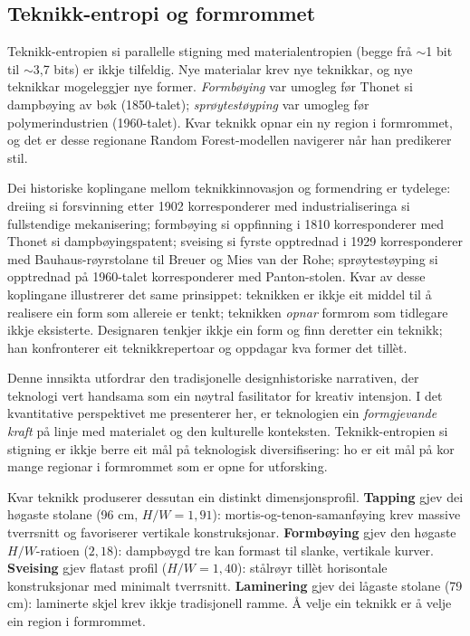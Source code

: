 \documentclass[10pt, a4paper, twocolumn]{article}
\begin{document}
\subsection{Teknikk-entropi og formrommet}

Teknikk-entropien si parallelle stigning med materialentropien (begge frå $\sim$1 bit til $\sim$3,7 bits) er ikkje tilfeldig. Nye materialar krev nye teknikkar, og nye teknikkar mogeleggjer nye former. \emph{Formbøying} var umogleg før Thonet si dampbøying av bøk (1850-talet); \emph{sprøytestøyping} var umogleg før polymerindustrien (1960-talet). Kvar teknikk opnar ein ny region i formrommet, og det er desse regionane Random Forest-modellen navigerer når han predikerer stil.

Dei historiske koplingane mellom teknikkinnovasjon og formendring er tydelege: dreiing si forsvinning etter 1902 korresponderer med industrialiseringa si fullstendige mekanisering; formbøying si oppfinning i 1810 korresponderer med Thonet si dampbøyingspatent; sveising si fyrste opptrednad i 1929 korresponderer med Bauhaus-røyrstolane til Breuer og Mies van der Rohe; sprøytestøyping si opptrednad på 1960-talet korresponderer med Panton-stolen. Kvar av desse koplingane illustrerer det same prinsippet: teknikken er ikkje eit middel til å realisere ein form som allereie er tenkt; teknikken \emph{opnar} formrom som tidlegare ikkje eksisterte. Designaren tenkjer ikkje ein form og finn deretter ein teknikk; han konfronterer eit teknikkrepertoar og oppdagar kva former det tillèt.

Denne innsikta utfordrar den tradisjonelle designhistoriske narrativen, der teknologi vert handsama som ein nøytral fasilitator for kreativ intensjon. I det kvantitative perspektivet me presenterer her, er teknologien ein \emph{formgjevande kraft} på linje med materialet og den kulturelle konteksten. Teknikk-entropien si stigning er ikkje berre eit mål på teknologisk diversifisering: ho er eit mål på kor mange regionar i formrommet som er opne for utforsking.

Kvar teknikk produserer dessutan ein distinkt dimensjonsprofil. \textbf{Tapping} gjev dei høgaste stolane (96 cm, $H/W = 1{,}91$): mortis-og-tenon-samanføying krev massive tverrsnitt og favoriserer vertikale konstruksjonar. \textbf{Formbøying} gjev den høgaste $H/W$-ratioen ($2{,}18$): dampbøygd tre kan formast til slanke, vertikale kurver. \textbf{Sveising} gjev flatast profil ($H/W = 1{,}40$): stålrøyr tillèt horisontale konstruksjonar med minimalt tverrsnitt. \textbf{Laminering} gjev dei lågaste stolane (79 cm): laminerte skjel krev ikkje tradisjonell ramme. Å velje ein teknikk er å velje ein region i formrommet.
\end{document}
